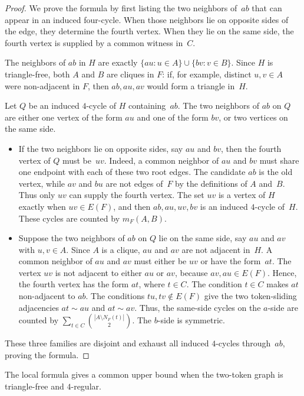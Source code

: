 \documentclass[a4paper]{article}
\theoremstyle{plain}
\theoremstyle{definition}
\numberwithin{equation}{section}
\begin{document}
\begin{proof}
We prove the formula by first listing the two neighbors of~$ab$ that can appear in an induced four-cycle.
When those neighbors lie on opposite sides of the edge, they determine the fourth vertex.
When they lie on the same side, the fourth vertex is supplied by a common witness in~$C$.

The neighbors of $ab$ in $H$ are exactly $\{au:u\in A\}\cup\{bv:v\in B\}$.
Since $H$ is triangle-free, both $A$ and $B$ are cliques in $F$: if, for example, distinct $u,v\in A$ were non-adjacent in $F$, then $ab,au,av$ would form a triangle in~$H$.

Let $Q$ be an induced $4$-cycle of $H$ containing~$ab$.
The two neighbors of $ab$ on $Q$ are either one vertex of the form $au$ and one of the form $bv$, or two vertices on the same side.

\begin{itemize}
\item If the two neighbors lie on opposite sides, say $au$ and $bv$, then the fourth vertex of $Q$ must be~$uv$.
Indeed, a common neighbor of $au$ and $bv$ must share one endpoint with each of these two root edges.
The candidate $ab$ is the old vertex, while $av$ and $bu$ are not edges of~$F$ by the definitions of $A$ and~$B$.
Thus only $uv$ can supply the fourth vertex.
The set $uv$ is a vertex of $H$ exactly when $uv\in E(F)$, and then $ab,au,uv,bv$ is an induced $4$-cycle of~$H$.
These cycles are counted by $m_F(A,B)$.

\item Suppose the two neighbors of $ab$ on $Q$ lie on the same side, say $au$ and $av$ with $u,v\in A$.
Since $A$ is a clique, $au$ and $av$ are not adjacent in~$H$.
A common neighbor of $au$ and $av$ must either be $uv$ or have the form~$at$.
The vertex $uv$ is not adjacent to either $au$ or $av$, because $av,au\in E(F)$.
Hence, the fourth vertex has the form $at$, where $t\in C$.
The condition $t\in C$ makes $at$ non-adjacent to $ab$.
The conditions $tu,tv\notin E(F)$ give the two token-sliding adjacencies $at\sim au$ and $at\sim av$.
Thus, the same-side cycles on the $a$-side are counted by $\displaystyle \sum_{t\in C}\binom{|A\setminus N_F(t)|}{2}$.
The $b$-side is symmetric.
\end{itemize}
These three families are disjoint and exhaust all induced $4$-cycles through~$ab$, proving the formula.
\end{proof}

The local formula gives a common upper bound when the two-token graph is triangle-free and $4$-regular.
\end{document}
